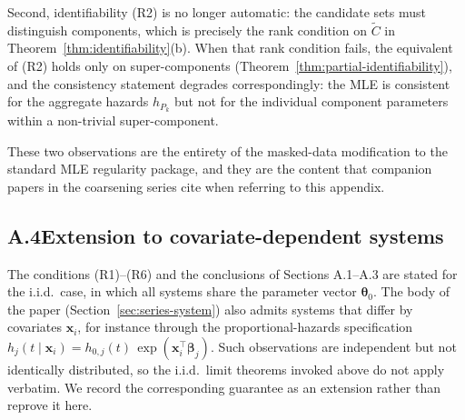 \documentclass[11pt]{article}
\theoremstyle{definition}
\theoremstyle{plain}
\renewcommand{\v}[1]{\boldsymbol{#1}}
\begin{document}
Second, identifiability (R2) is no longer automatic: the candidate
sets must distinguish components, which is precisely the rank
condition on $\tilde C$ in Theorem~\ref{thm:identifiability}(b). When
that rank condition fails, the equivalent of (R2) holds only on
super-components (Theorem~\ref{thm:partial-identifiability}), and the
consistency statement degrades correspondingly: the MLE is consistent
for the aggregate hazards $h_{P_k}$ but not for the individual
component parameters within a non-trivial super-component.

These two observations are the entirety of the masked-data
modification to the standard MLE regularity package, and they are the
content that companion papers in the coarsening series cite when
referring to this appendix.

\subsection*{A.4\quad Extension to covariate-dependent systems}

The conditions (R1)--(R6) and the conclusions of Sections A.1--A.3 are
stated for the i.i.d.\ case, in which all systems share the parameter
vector $\v{\theta}_0$. The body of the paper
(Section~\ref{sec:series-system}) also admits systems that differ by
covariates $\v{x}_i$, for instance through the proportional-hazards
specification $h_j(t \mid \v{x}_i) = h_{0,j}(t)\,\exp(\v{x}_i^{\top}
\v{\beta}_j)$. Such observations are independent but not identically
distributed, so the i.i.d.\ limit theorems invoked above do not apply
verbatim. We record the corresponding guarantee as an extension rather
than reprove it here.
\end{document}
